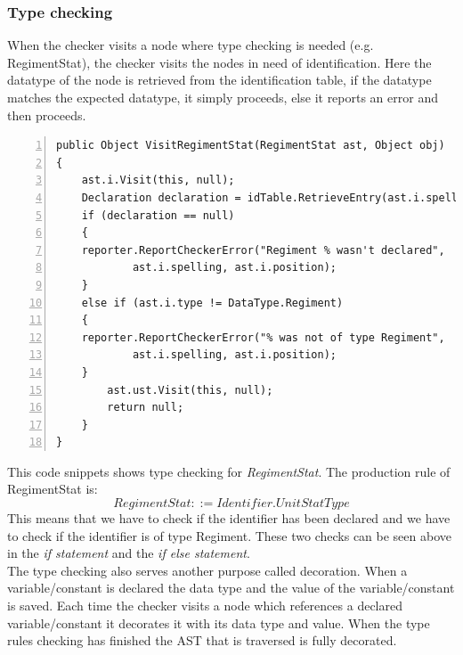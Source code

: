 		\subsubsection{Type checking}			
			When the checker visits a node where type checking is needed (e.g. RegimentStat), the checker visits the nodes 
			in need of identification. Here the datatype of the node is retrieved from the identification table, if the datatype matches the 
			expected datatype, it simply proceeds, else it reports an error and then proceeds. \\
\begin{lstlisting}[basicstyle=\small\sffamily,
					keywords={break,case,const,continue,default,else,enum,
					for,if,return,switch,while,do,long,void,int,float,double,
					char,struct,typedef,include,size\_t},
					keywordstyle={\color{blue}},
					comment={[l]{//}}, morecomment={[s]{/*}{*/}}, commentstyle=\itshape,
					columns={[l]flexible}, numbers=left, numberstyle=\tiny,
					frameround=fftt, frame=shadowbox, captionpos=b,
					caption={Type checking of RegimentStat},
					label=impl:typecheck]	
public Object VisitRegimentStat(RegimentStat ast, Object obj)
{
	ast.i.Visit(this, null);
	Declaration declaration = idTable.RetrieveEntry(ast.i.spelling);
	if (declaration == null)
	{
	reporter.ReportCheckerError("Regiment % wasn't declared", 
			ast.i.spelling, ast.i.position);
	}
	else if (ast.i.type != DataType.Regiment)
	{
	reporter.ReportCheckerError("% was not of type Regiment", 
			ast.i.spelling, ast.i.position);
	}
		ast.ust.Visit(this, null);
		return null;
    }
}
\end{lstlisting}
			This code snippets shows type checking for {\it RegimentStat}. 
			The production rule of RegimentStat is:
			\begin{equation}
				RegimentStat ::= Identifier.UnitStatType
			\end{equation} 
			This means that we have to check if the identifier has been declared and we have to check if the identifier is of type Regiment.
			These two checks can be seen above in the {\it if statement} and the {\it if else statement}. \\
			
			The type checking also serves another purpose called decoration. When a variable/constant is declared the data type 
			and the value of the variable/constant is saved. Each time the checker visits a node which references a declared 
			variable/constant it decorates it with its data type and value.
			When the type rules checking has finished the AST that is traversed is fully decorated.
			
			
		